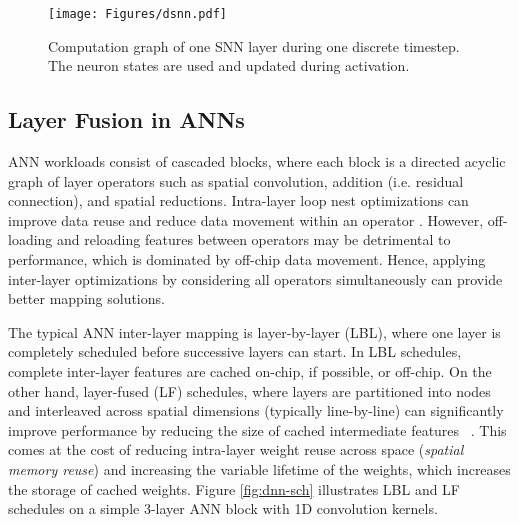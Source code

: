 
\begin{figure}[!t]
\centering
\texttt{[image: Figures/dsnn.pdf]}
\caption{Computation graph of one SNN layer during one discrete timestep. The neuron states are used and updated during activation.}
\label{fig:state}
\end{figure}


\subsection{Layer Fusion in ANNs}
\label{sec:lf}

ANN workloads consist of cascaded blocks, where each block is a directed acyclic graph of layer operators such as spatial convolution, addition (i.e. residual connection), and spatial reductions. Intra-layer loop nest optimizations can improve data reuse and reduce data movement within an operator \cite{zigzag}. However, off-loading and reloading features between operators may be detrimental to performance, which is dominated by off-chip data movement. Hence, applying inter-layer optimizations by considering all operators simultaneously can provide better mapping solutions.%

The typical ANN inter-layer mapping is layer-by-layer (LBL), where one layer is completely scheduled before successive layers can start. In LBL schedules, complete inter-layer features are cached on-chip, if possible, or off-chip. On the other hand, layer-fused (LF) schedules, where layers are partitioned into nodes and interleaved across spatial dimensions (typically line-by-line) can significantly improve performance by reducing the size of cached intermediate features ~\cite{stream, Sioutas2020ScheduleSF, 9646923, 8667835}. This comes at the cost of reducing intra-layer weight reuse across space (\textit{spatial memory reuse}) and increasing the variable lifetime of the weights, which increases the storage of cached weights. Figure \ref{fig:dnn-sch} illustrates LBL and LF schedules on a simple 3-layer ANN block with 1D convolution kernels. 



